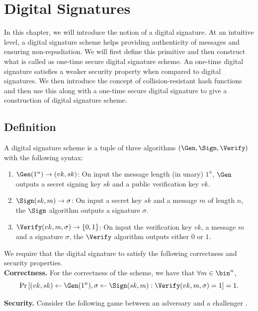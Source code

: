 

\chapter{Digital Signatures}

In this chapter, we will introduce the notion of a digital signature. At an intuitive level, a digital signature scheme helps providing authenticity of messages and ensuring non-repudiation. We will first define this primitive and then construct what is called as one-time secure digital signature scheme. An one-time digital signature satisfies a weaker security property when compared to digital signatures. We then introduce the concept of collision-resistant hash functions and then use this along with a one-time secure digital signature to give a construction of digital signature scheme.

\section{Definition}

A digital signature scheme is a tuple of three algorithms $(\Gen,\Sign,\Verify)$ with the following syntax:
\begin{enumerate}
\item $\Gen(1^n)\to (vk,sk)$: On input the message length (in unary) $1^n$, $\Gen$ outputs a secret signing key $sk$ and a public verification key $vk$.
\item $\Sign(sk, m) \to \sigma$: On input a secret key $sk$ and a message $m$ of length $n$, the $\Sign$ algorithm outputs a signature $\sigma$.
\item $\Verify(vk, m, \sigma) \to \{0,1\}$: On input the verification key $vk$, a message $m$ and a signature $\sigma$, the $\Verify$ algorithm outputs either $0$ or $1$.
\end{enumerate}

We require that the digital signature to satisfy the following correctness and security properties.\\
\medskip
\noindent\textbf{Correctness.} For the correctness of the scheme, we have that
$\forall m \in \bin^n$,
\[\Pr \left[ (vk,sk) \gets \Gen(1^n), \sigma \leftarrow \Sign(sk,m) : \Verify(vk, m, \sigma) = 1 \right] = 1.\]

\medskip
\noindent\textbf{Security.} Consider the following game between an adversary and a challenger
.

